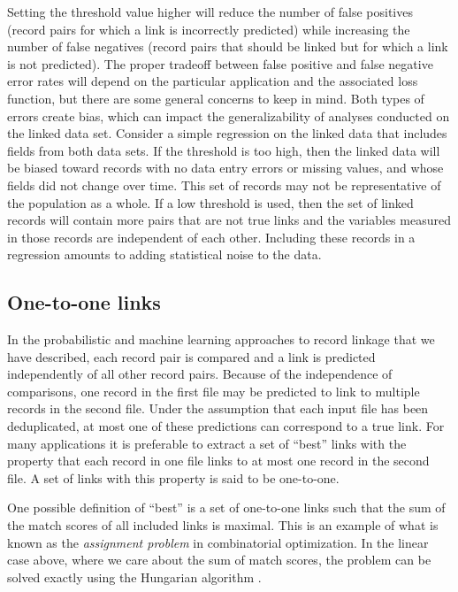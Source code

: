 \documentclass[]{krantz}
\begin{document}
Setting the threshold value higher will reduce the number of false
positives (record pairs for which a link is incorrectly predicted) while
increasing the number of false negatives (record pairs that should be
linked but for which a link is not predicted). The proper tradeoff
between false positive and false negative error rates will depend on the
particular application and the associated loss function, but there are
some general concerns to keep in mind. Both types of errors create bias,
which can impact the generalizability of analyses conducted on the
linked data set. Consider a simple regression on the linked data that
includes fields from both data sets. If the threshold is too high, then
the linked data will be biased toward records with no data entry errors
or missing values, and whose fields did not change over time. This set
of records may not be representative of the population as a whole. If a
low threshold is used, then the set of linked records will contain more
pairs that are not true links and the variables measured in those
records are independent of each other. Including these records in a
regression amounts to adding statistical noise to the data.

\subsection{One-to-one links}\label{one-to-one-links}

In the probabilistic and machine learning approaches to record linkage
that we have described, each record pair is compared and a link is
predicted independently of all other record pairs. Because of the
independence of comparisons, one record in the first file may be
predicted to link to multiple records in the second file. Under the
assumption that each input file has been deduplicated, at most one of
these predictions can correspond to a true link. For many applications
it is preferable to extract a set of ``best'' links with the property
that each record in one file links to at most one record in the second
file. A set of links with this property is said to be one-to-one.

One possible definition of ``best'' is a set of one-to-one links such
that the sum of the match scores of all included links is maximal. This
is an example of what is known as the \emph{assignment problem} in
combinatorial optimization. In the linear case above, where we care
about the sum of match scores, the problem can be solved exactly using
the Hungarian algorithm \citep{kuhn2005hungarian}.
\end{document}
